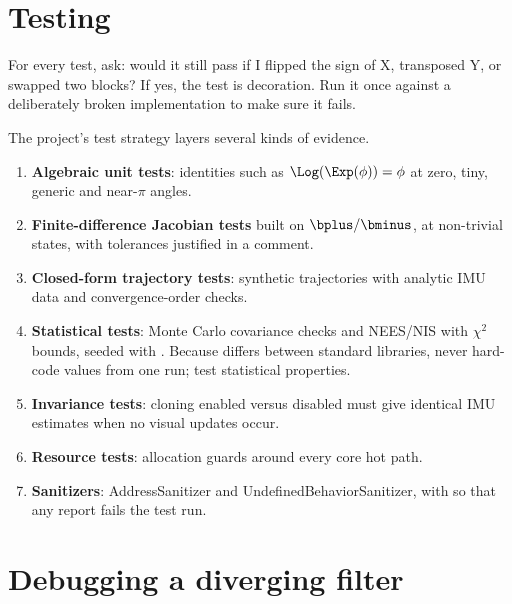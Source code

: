 \section{Testing}

\begin{keyidea}
For every test, ask: would it still pass if I flipped the sign of X, transposed Y, or swapped two blocks? If yes, the test is
decoration. Run it once against a deliberately broken implementation to make sure it fails.
\end{keyidea}

The project's test strategy layers several kinds of evidence.
\begin{enumerate}
  \item \textbf{Algebraic unit tests}: identities such as $\Log(\Exp(\phi)) = \phi$ at zero, tiny, generic and near-$\pi$ angles.
  \item \textbf{Finite-difference Jacobian tests} built on $\bplus/\bminus$, at non-trivial states, with tolerances justified in a comment.
  \item \textbf{Closed-form trajectory tests}: synthetic trajectories with analytic IMU data and convergence-order checks.
  \item \textbf{Statistical tests}: Monte Carlo covariance checks and NEES/NIS with $\chi^2$ bounds, seeded with
        . Because  differs between standard libraries, never hard-code values from one
        run; test statistical properties.
  \item \textbf{Invariance tests}: cloning enabled versus disabled must give identical IMU estimates when no visual updates occur.
  \item \textbf{Resource tests}: allocation guards around every core hot path.
  \item {\sloppy\textbf{Sanitizers}: AddressSanitizer and UndefinedBehaviorSanitizer, with
         so that any report fails the test run.\par}
\end{enumerate}

\section{Debugging a diverging filter}

